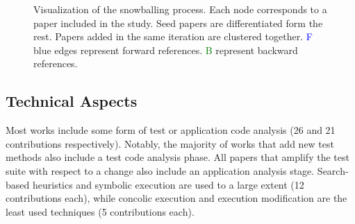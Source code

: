 \begin{figure}
	\centering
	\caption{Visualization of the snowballing process. Each node corresponds to a paper included in the study. Seed papers are differentiated form the rest. Papers added in the same iteration are clustered together. \textcolor{blue}{F} blue edges represent forward references. \textcolor{green}{B} represent backward references.}
	\label{fig:citation_graph}
\end{figure}


\subsection{Technical Aspects}
\label{subsec:sota:analysis:technical-aspects}

Most works include some form of test or application code analysis (26 and 21 contributions respectively). 
Notably, the majority of works that add new test methods also include a test code analysis phase. 
All papers that amplify the test suite with respect to a change also include an application analysis stage. 
Search-based heuristics and symbolic execution are used to a large extent (12 contributions each), while concolic execution and execution modification are the least used techniques (5 contributions each).

